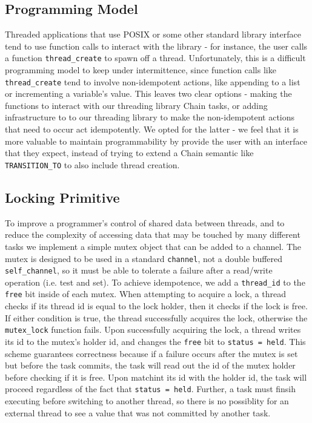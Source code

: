 \documentclass[11pt]{sensys-proc}
\newcommand{\chain}{Chain\xspace}
\begin{document}
\subsection{Programming Model}
Threaded applications that use POSIX or some other standard library interface
tend to use function calls to interact with the library - for instance, the
user calls a function \texttt{thread\_create} to spawn off a thread.
Unfortunately, this is a difficult programming model to keep under
intermittence, since function calls like \texttt{thread\_create} tend to
involve non-idempotent actions, like appending to a list or incrementing a
variable's value. This leaves two clear options - making the functions to
interact with our threading library \chain tasks, or adding infrastructure to
to our threading library to make the non-idempotent actions that need to occur
act idempotently. We opted for the latter - we feel that it is more valuable to
maintain programmability by provide the user with an interface that they
expect, instead of trying to extend a \chain semantic like
\texttt{TRANSITION\_TO} to also include thread creation.


\subsection{Locking Primitive}
To improve a programmer's control of shared data between threads, and to reduce
the complexity of accessing data that may be touched by many different tasks we
implement a simple mutex object that can be added to a channel. The mutex is
designed to be used in a standard \texttt{channel}, not a double buffered
\texttt{self\_channel}, so it must be able to tolerate a failure after a
read/write operation (i.e. test and set). To achieve idempotence, we add a
\texttt{thread\_id} to the \texttt{free} bit inside of each mutex. When
attempting to acquire a lock, a thread checks if its thread id is equal to the
lock holder, then it checks if the lock is free. If either condition is true,
the thread successfully acquires the lock, otherwise the \texttt{mutex\_lock}
function fails. Upon successfully acquiring the lock, a thread writes its id to
the mutex's holder id, and changes the \texttt{free} bit to \texttt{status =
held}. This scheme guarantees correctness because if a failure occurs after the
mutex is set but before the task commits, the task will read out the id of the
mutex holder before checking if it is free. Upon matchint its id with the holder
id, the task will proceed regardless of the fact that \texttt{status = held}.
Further, a task must finsih executing before switching to another thread, so
there is no possiblity for an external thread to see a value that was not
committed by another task.
\end{document}

